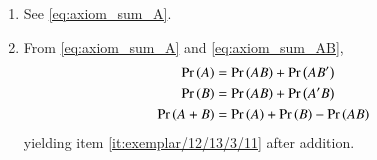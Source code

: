 \begin{enumerate}
\item See
\eqref{eq:axiom_sum_A}.
\item From 
\eqref{eq:axiom_sum_A}
and
\eqref{eq:axiom_sum_AB},
\begin{align}
	\pr{A} &= \pr{AB} + \pr{AB^\prime}
\label{eq:exemplar/12/13/3/11/1}
	\\
	\pr{B} &= \pr{AB} + \pr{A^\prime B}
	\\
\pr{A+B} &= \pr{A} + \pr{B} - \pr{AB} 
\label{eq:exemplar/12/13/3/11/2}
\end{align}
yielding
item \ref{it:exemplar/12/13/3/11} after addition. 
\end{enumerate}


